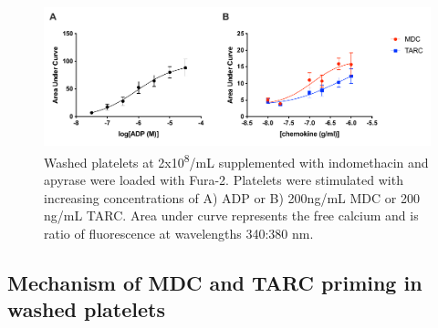 \documentclass[11pt,twoside]{bristolthesis}
\begin{document}
\begin{figure}
\includegraphics[width=0.9\linewidth]{figure/Chemokines/Layouts/MDC_TARC_calcium_wp} \caption[The effect of ADP and the chemokines MDC and TARC alone on calcium mobilisation in washed platelets.]{Washed platelets at 2x10\textsuperscript{8}/mL supplemented with indomethacin and apyrase were loaded with Fura-2. Platelets were stimulated with increasing concentrations of A) ADP or B) 200ng/mL MDC or 200 ng/mL TARC. Area under curve represents the free calcium and is ratio of fluorescence at wavelengths 340:380 nm.}\label{fig:MDC-TARC-wp-calcium}
\end{figure}
\hypertarget{mechanism-of-mdc-and-tarc-priming-in-washed-platelets}{%
\subsection{Mechanism of MDC and TARC priming in washed platelets}\label{mechanism-of-mdc-and-tarc-priming-in-washed-platelets}}
\end{document}
